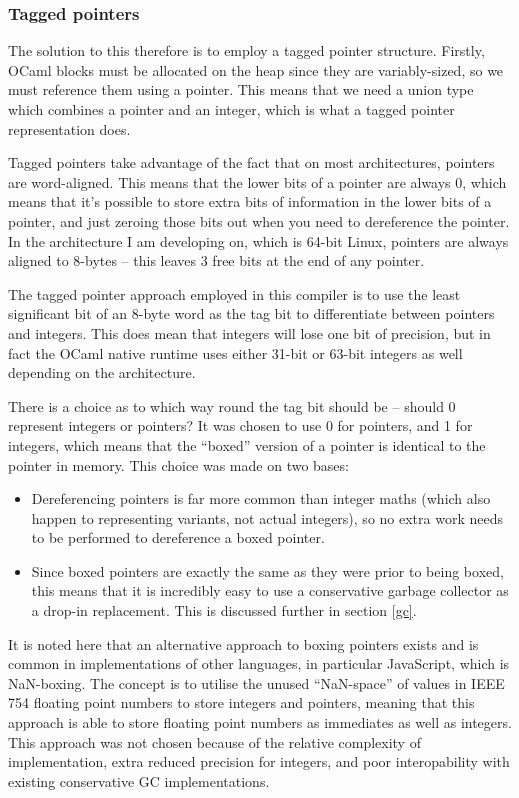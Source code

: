 \documentclass[12pt,a4paper,twoside,openright]{report}
\begin{document}
\subsubsection{Tagged pointers}

The solution to this therefore is to employ a tagged pointer structure. 
Firstly, OCaml blocks must be allocated on the heap since they are 
variably-sized, so we must reference them using a pointer. This means that we 
need a union type which combines a pointer and an integer, which is what a 
tagged pointer representation does.

Tagged pointers take advantage of the fact that on most architectures, pointers 
are word-aligned. This means that the lower bits of a pointer are always 0, 
which means that it's possible to store extra bits of information in the lower 
bits of a pointer, and just zeroing those bits out when you need to dereference 
the pointer. In the architecture I am developing on, which is 64-bit Linux, 
pointers are always aligned to 8-bytes -- this leaves 3 free bits at the end of 
any pointer.

The tagged pointer approach employed in this compiler is to use the least 
significant bit of an 8-byte word as the tag bit to differentiate between 
pointers and integers. This does mean that integers will lose one bit of 
precision, but in fact the OCaml native runtime uses either 31-bit or 63-bit 
integers as well depending on the architecture.

There is a choice as to which way round the tag bit should be -- should 0 
represent integers or pointers? It was chosen to use 0 for pointers, and 1 for 
integers, which means that the ``boxed'' version of a pointer is identical to 
the pointer in memory. This choice was made on two bases:

\begin{itemize}
    \item Dereferencing pointers is far more common than integer maths (which 
    also happen to representing variants, not actual integers), so no extra 
    work needs to be performed to dereference a boxed pointer.
    \item Since boxed pointers are exactly the same as they were prior to being 
    boxed, this means that it is incredibly easy to use a conservative garbage 
    collector as a drop-in replacement. This is discussed further in section 
    \ref{gc}.
\end{itemize}

It is noted here that an alternative approach to boxing pointers exists and is 
common in implementations of other languages, in particular JavaScript, which 
is NaN-boxing. The concept is to utilise the unused ``NaN-space'' of values in 
IEEE 754 floating point numbers to store integers and pointers, meaning that 
this approach is able to store floating point numbers as immediates as well as 
integers. This approach was not chosen because of the relative complexity of 
implementation, extra reduced precision for integers, and poor interopability 
with existing conservative GC implementations.
\end{document}
